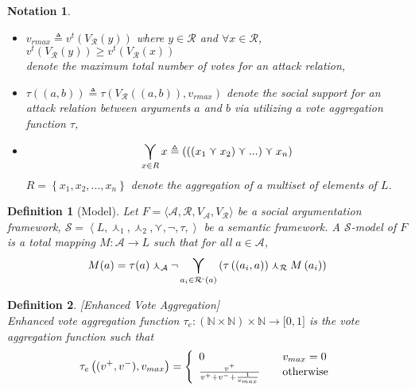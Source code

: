 \documentclass{article}
\newtheorem{definition}{Definition}
\newtheorem{notation}{Notation}
\newcommand{\args}{\mathcal{A}} %
\newcommand{\att}{\mathcal{R}}  %
\newcommand{\valueset}{L}
\newcommand{\varg}{V_{\args}}   %
\newcommand{\vargpro}[1]{\varg^+\left(#1\right)} %
\newcommand{\vargcon}[1]{\varg^-\left(#1\right)} %
\newcommand{\vargtot}[1]{\varg^{max}\left(#1\right)} %
\newcommand{\vatt}{V_{\att}}   %
\newcommand{\vattcon}[1]{\vatt^-\left(#1\right)} %
\newcommand{\attackers}[1]{\att^\text{-}\left(#1\right)}
\newcommand{\safid}{F}               %
\newcommand{\saf}{\safid = \safbody} %
\newcommand{\safbody}{\langle \args, \att, \varg, \vatt \rangle} %
\newcommand{\semid}{\mathcal{S}}        %
\newcommand{\sembodyNew}{\left\langle \valueset,\SAFand_1, \SAFand_2,\SAFor,\lnot,\tau, \right\rangle} %
\newcommand{\SAFand}{\curlywedge}     %
\newcommand{\SAFor}{\curlyvee}        %
\DeclareMathOperator*{\SAFOr}{\bigcurlyvee} %
\newcommand{\sem}{\mathcal{S}}
\begin{document}
\begin{notation}
\begin{itemize}
\begin{itemize}
\item  $ \vattcon{(a, b)} \triangleq y$ denote the number of negative votes for an attack relation between arguments  $a$ and $b$,
\end{itemize}
whenever $\vatt ((a, b)) = (x, y)$,
\item $v_{rmax} \triangleq v^t(\vatt(y))$ where $y \in \att$ and $\forall x \in \att$, $v^t(\vatt(y)) \ge v^t(\vatt(x))$ 
\\  denote the maximum total number of votes for an attack relation,
\item $\tau((a, b)) \triangleq \tau(V_{\mathcal{R}}((a, b)), v_{rmax})$ denote the social support for an attack relation between arguments  $a$ and $b$ via utilizing a vote aggregation function $\tau$,%
\item$$\SAFOr_{x \in R} x \triangleq\left(\left(\left(  x_{1}\SAFor x_{2}\right) \SAFor...\right)\SAFor x_{n}\right)$$ $R=\left\{  x_{1},x_{2},...,x_{n}\right\}$ denote the aggregation of a multiset of elements of $\valueset$. 
\end{itemize}
\end{notation}

\begin{definition}[Model]
\label{def:model}
  Let $\saf$ be a social argumentation framework, $\sem = \sembodyNew$ be a semantic framework. A $\semid$-model of $\safid$ is a total mapping $M : \args \rightarrow \valueset$ such that for all $a \in \args$,
  $$\displaystyle M(a) = \tau(a) \SAFand_\args \lnot \SAFOr_{a_i \in \attackers{a}} \left(\tau\left((a_i, a)\right) \SAFand_\att M\left(a_i\right)\right)$$
\end{definition}


\begin{definition}
\label{def:enhVoteAgg}
[Enhanced Vote Aggregation]
\\ Enhanced vote aggregation function
$\tau_{e}:
(\mathbb{N} \times \mathbb{N}) \times \mathbb{N}
\rightarrow\lbrack0,1]$ is the vote aggregation function such that
\[
\tau_{e}\left(  (v^{+},v^{-}), v_{max}\right)  = \left\{
\begin{array}
[c]{lll}
0 &  & v_{max}=0\\
\frac{v^{+}}{v^{+}+v^{-}+\frac{1}{v_{max}}} &  & \text{otherwise}%
\end{array}
\right.
\]
\end{definition}
\end{document}
